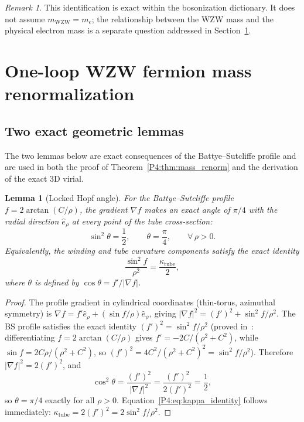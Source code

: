 \documentclass[11pt,a4paper]{article}
\newtheorem{lemma}[theorem]{Lemma}
\theoremstyle{definition}
\theoremstyle{remark}
\newtheorem{remark}[theorem]{Remark}
\newcommand{\mWZW}{m_{\mathrm{WZW}}}
\begin{document}
\begin{remark}
\label{P4:rem:bosonization_exact}
This identification is exact within the bosonization dictionary.
It does not assume $\mWZW = m_e$; the relationship between the WZW
mass and the physical electron mass is a separate question
addressed in Section~\ref{P4:sec:mass_renorm}.
\end{remark}

\section{One-loop WZW fermion mass renormalization}
\label{P4:sec:mass_renorm}

\subsection{Two exact geometric lemmas}
\label{P4:sec:geom_lemmas}

The two lemmas below are exact consequences of the Battye--Sutcliffe profile
and are used in both the proof of Theorem~\ref{P4:thm:mass_renorm} and the
derivation of the exact 3D virial.

\begin{lemma}[Locked Hopf angle]
\label{P4:lem:locked_angle}
For the Battye--Sutcliffe profile $f = 2\arctan(C/\rho)$, the gradient $\nabla f$
makes an exact angle of $\pi/4$ with the radial direction $\hat{e}_\rho$
at every point of the tube cross-section:
\begin{equation}
  \sin^2\!\theta = \frac{1}{2},
  \qquad \theta = \frac{\pi}{4}, \qquad \forall\,\rho > 0.
  \label{P4:eq:locked_angle}
\end{equation}
Equivalently, the winding and tube curvature components satisfy the exact identity
\begin{equation}
  \frac{\sin^2\!f}{\rho^2} = \frac{\kappa_\mathrm{tube}}{2},
  \label{P4:eq:kappa_identity}
\end{equation}
where $\theta$ is defined by $\cos\theta = f'/|\nabla f|$.
\end{lemma}

\begin{proof}
The profile gradient in cylindrical coordinates (thin-torus, azimuthal symmetry) is
$\nabla f = f'\hat{e}_\rho + (\sin f/\rho)\hat{e}_\psi$,
giving $|\nabla f|^2 = (f')^2 + \sin^2\!f/\rho^2$.
The BS profile satisfies the exact identity $(f')^2 = \sin^2\!f/\rho^2$
(proved in~\cite{Paper2,Paper3}: differentiating $f=2\arctan(C/\rho)$ gives
$f' = -2C/(\rho^2+C^2)$, while $\sin f = 2C\rho/(\rho^2+C^2)$, so
$(f')^2 = 4C^2/(\rho^2+C^2)^2 = \sin^2\!f/\rho^2$).
Therefore $|\nabla f|^2 = 2(f')^2$, and
\[
  \cos^2\!\theta = \frac{(f')^2}{|\nabla f|^2} = \frac{(f')^2}{2(f')^2} = \frac{1}{2},
\]
so $\theta = \pi/4$ exactly for all $\rho > 0$.
Equation~\eqref{P4:eq:kappa_identity} follows immediately:
$\kappa_\mathrm{tube} = 2(f')^2 = 2\sin^2\!f/\rho^2$.
\end{proof}
\end{document}
